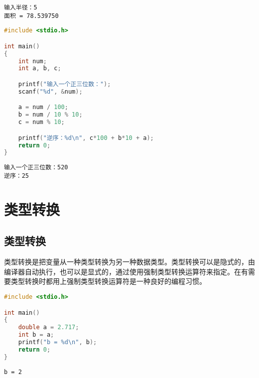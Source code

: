 \begin{tcolorbox}
	\begin{verbatim}
输入半径：5
面积 = 78.539750
	\end{verbatim}
\end{tcolorbox}

\vspace{0.5cm}


\begin{lstlisting}[language=C]
#include <stdio.h>

int main()
{
	int num;
	int a, b, c;

	printf("输入一个正三位数：");
	scanf("%d", &num);

	a = num / 100;
	b = num / 10 % 10;
	c = num % 10;

	printf("逆序：%d\n", c*100 + b*10 + a);
	return 0;
}
\end{lstlisting}

\begin{tcolorbox}
	\begin{verbatim}
输入一个正三位数：520
逆序：25
	\end{verbatim}
\end{tcolorbox}

\newpage

\section{类型转换}

\subsection{类型转换}

类型转换是把变量从一种类型转换为另一种数据类型。类型转换可以是隐式的，由编译器自动执行，也可以是显式的，通过使用强制类型转换运算符来指定。在有需要类型转换时都用上强制类型转换运算符是一种良好的编程习惯。\\


\begin{lstlisting}[language=C]
#include <stdio.h>

int main()
{
	double a = 2.717;
	int b = a;
	printf("b = %d\n", b);
	return 0;
}
\end{lstlisting}

\begin{tcolorbox}
	\begin{verbatim}
b = 2
	\end{verbatim}
\end{tcolorbox}

